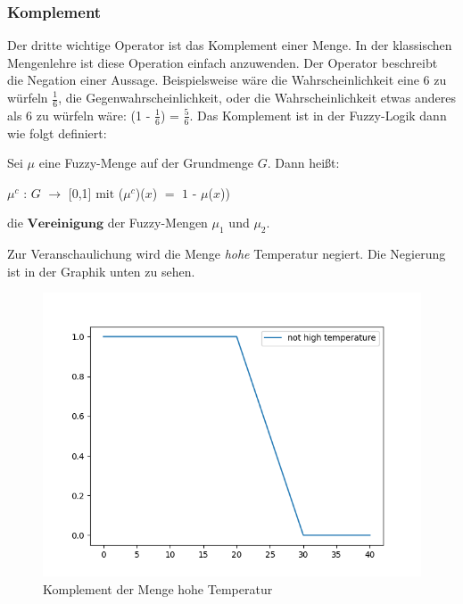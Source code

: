 \subsubsection{Komplement}

Der dritte wichtige Operator ist das Komplement einer Menge. In der klassischen Mengenlehre ist diese Operation einfach anzuwenden. Der Operator beschreibt die Negation einer Aussage. Beispielsweise wäre die Wahrscheinlichkeit eine 6 zu würfeln $\frac{1}{6}$, die Gegenwahrscheinlichkeit, oder die Wahrscheinlichkeit etwas anderes als 6 zu würfeln wäre: (1 - $\frac{1}{6}$) = $\frac{5}{6}$. Das Komplement ist in der Fuzzy-Logik dann wie folgt definiert: 

\begin{definition}
	Sei $\mu$ eine Fuzzy-Menge auf der Grundmenge $G$. Dann heißt:
	\begin{center}
		$\mu^c$  : $G$ $\rightarrow$ [0,1] $\text{mit}$  ($\mu^c$)($x$) $=$ $1$ - $\mu$($x$)) 
	\end{center}
	die $\textbf{Vereinigung}$ der Fuzzy-Mengen $\mu_1$ und $\mu_2$.
\end{definition}

Zur Veranschaulichung wird die Menge \textit{hohe} Temperatur negiert. Die Negierung ist in der Graphik unten zu sehen.


\begin{figure}[H]
	\centering
	\includegraphics[scale=0.5]{images/not_high_temp.png}
	\caption{Komplement der Menge hohe Temperatur}
\end{figure}\label{not_high_temp}

